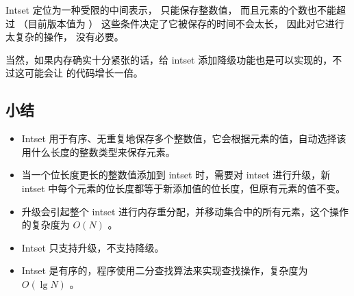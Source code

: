 \documentclass[a4paper,11pt,english]{sphinxmanual}
\begin{document}
Intset 定位为一种受限的中间表示，
只能保存整数值，
而且元素的个数也不能超过  （目前版本值为  ）
这些条件决定了它被保存的时间不会太长，
因此对它进行太复杂的操作，
没有必要。

当然，如果内存确实十分紧张的话，给 intset 添加降级功能也是可以实现的，不过这可能会让  的代码增长一倍。


\subsection{小结}
\label{compress-datastruct/intset:id20}\begin{itemize}
\item {} 
Intset 用于有序、无重复地保存多个整数值，它会根据元素的值，自动选择该用什么长度的整数类型来保存元素。

\item {} 
当一个位长度更长的整数值添加到 intset 时，需要对 intset 进行升级，新 intset 中每个元素的位长度都等于新添加值的位长度，但原有元素的值不变。

\item {} 
升级会引起整个 intset 进行内存重分配，并移动集合中的所有元素，这个操作的复杂度为 $O(N)$ 。

\item {} 
Intset 只支持升级，不支持降级。

\item {} 
Intset 是有序的，程序使用二分查找算法来实现查找操作，复杂度为 $O(\lg N)$ 。

\end{itemize}
\end{document}
